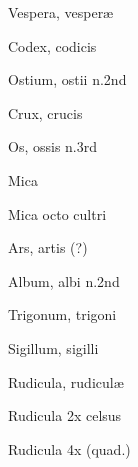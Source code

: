  {\mktsStyleItalic{}Vespera\/}, vesperæ


 {\mktsStyleItalic{}Codex\/}, codicis


 {\mktsStyleItalic{}Ostium\/}, ostii {\mktsStyleItalic{}n.2nd\/}


 {\mktsStyleItalic{}Crux\/}, crucis


 {\mktsStyleItalic{}Os\/}, ossis {\mktsStyleItalic{}n.3rd\/}


 {\mktsStyleItalic{}Mica\/}


 {\mktsStyleItalic{}Mica octo cultri\/}


 {\mktsStyleItalic{}Ars\/}, artis (?)


 {\mktsStyleItalic{}Album\/}, albi {\mktsStyleItalic{}n.2nd\/}


 {\mktsStyleItalic{}Trigonum\/}, trigoni


 {\mktsStyleItalic{}Sigillum\/}, sigilli


 {\mktsStyleItalic{}Rudicula\/}, rudiculæ


 {\mktsStyleItalic{}Rudicula 2x celsus\/}


 {\mktsStyleItalic{}Rudicula 4x (quad.)\/}



